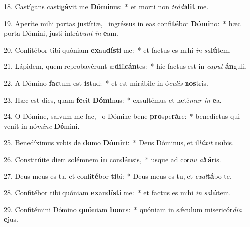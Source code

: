 18. Castígans casti\textbf{gá}vit me \textbf{Dó}\textbf{mi}nus:~*  et morti non \textit{trá}\textit{di}\textbf{dit} me.\

19. Aperíte mihi portas justítiæ, \dag\  ingréssus in eas confi\textbf{té}bor \textbf{Dó}\textbf{mi}no:~*  hæc porta Dómini, justi intrá\textit{bunt} \textit{in} \textbf{e}am.\

20. Confitébor tibi quóniam \textbf{ex}au\textbf{dís}\textbf{ti} me:~*  et factus es mihi \textit{in} \textit{sa}\textbf{lú}tem.\

21. Lápidem, quem reprobavérunt æ\textbf{di}fi\textbf{cán}tes:~*  hic factus est in \textit{ca}\textit{put} \textbf{án}guli.\

22. A Dómino \textbf{fac}tum est \textbf{is}tud:~*  et est mirábile in ó\textit{cu}\textit{lis} \textbf{nos}tris.\

23. Hæc est dies, quam \textbf{fe}cit \textbf{Dó}\textbf{mi}nus:~*  exsultémus et læté\textit{mur} \textit{in} \textbf{e}a.\

24. O Dómine, salvum me fac, \dag\  o Dómine bene \textbf{pro}spe\textbf{rá}re:~*  benedíctus qui venit in nó\textit{mi}\textit{ne} \textbf{Dó}mini.\

25. Benedíximus vobis de \textbf{do}mo \textbf{Dó}\textbf{mi}ni:~*  Deus Dóminus, et il\textit{lú}\textit{xit} \textbf{no}bis.\

26. Constitúite diem solémnem \textbf{in} con\textbf{dén}sis,~*  usque ad cor\textit{nu} \textit{al}\textbf{tá}ris.\

27. Deus meus es tu, et confi\textbf{té}bor \textbf{ti}bi:~*  Deus meus es tu, et \textit{ex}\textit{al}\textbf{tá}bo te.\

28. Confitébor tibi quóniam \textbf{ex}au\textbf{dís}\textbf{ti} me:~*  et factus es mihi \textit{in} \textit{sa}\textbf{lú}tem.\

29. Confitémini Dómino \textbf{quón}iam \textbf{bo}nus:~*  quóniam in sǽculum misericór\textit{di}\textit{a} \textbf{e}jus.\

